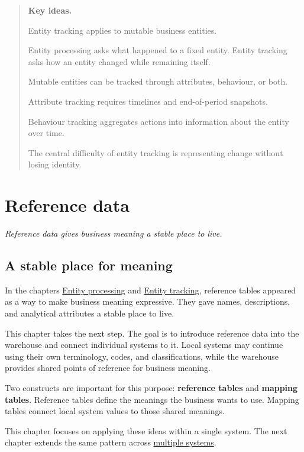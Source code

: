 \documentclass[10pt,openany,10pt]{book}
\begin{document}
\begin{quote}
\textbf{Key ideas.}

Entity tracking applies to mutable business entities.

Entity processing asks what happened to a fixed entity. Entity tracking
asks how an entity changed while remaining itself.

Mutable entities can be tracked through attributes, behaviour, or both.

Attribute tracking requires timelines and end-of-period snapshots.

Behaviour tracking aggregates actions into information about the entity
over time.

The central difficulty of entity tracking is representing change without
losing identity.
\end{quote}

\newpage

\chapter{Reference data}\label{docs-creating-information-reference-data}

\emph{Reference data gives business meaning a stable place to live.}

\section{A stable place for meaning}\label{a-stable-place-for-meaning}

In the chapters
\hyperref[docs-creating-information-entity-processing]{Entity
processing} and
\hyperref[docs-creating-information-entity-tracking]{Entity tracking},
reference tables appeared as a way to make business meaning expressive.
They gave names, descriptions, and analytical attributes a stable place
to live.

This chapter takes the next step. The goal is to introduce reference
data into the warehouse and connect individual systems to it. Local
systems may continue using their own terminology, codes, and
classifications, while the warehouse provides shared points of reference
for business meaning.

Two constructs are important for this purpose: \textbf{reference tables}
and \textbf{mapping tables}. Reference tables define the meanings the
business wants to use. Mapping tables connect local system values to
those shared meanings.

This chapter focuses on applying these ideas within a single system. The
next chapter extends the same pattern across
\hyperref[docs-creating-information-conforming-systems]{multiple
systems}.
\end{document}
